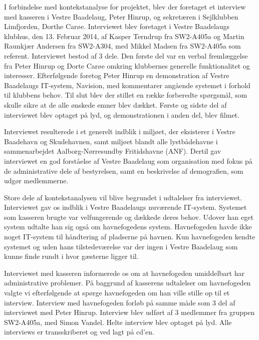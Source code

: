 
I forbindelse med kontekstanalyse for projektet, blev der foretaget et interview med kasseren i Vestre Baadelaug, Peter Hinrup, og sekretæren i Sejlklubben Limfjorden, Dorthe Carøe. Interviewet blev foretaget i Vestre Baadelaugs klubhus, den 13. Februar 2014, af Kasper Terndrup fra SW2-A405a og Martin Raunkjær Andersen fra SW2-A304, med Mikkel Madsen fra SW2-A405a som referent. Interviewet bestod af 3 dele. Den første del var en verbal fremlæggelse fra Peter Hinrup og Dorte Carøe omkring klubbernes generelle funktionalitet og interesser. Efterfølgende foretog Peter Hinrup en demonstration af Vestre Baadelaugs IT-system, Navision, med kommentarer angående systemet i forhold til klubbens behov. Til slut blev der stillet en række forberedte spørgsmål, som skulle sikre at de alle ønskede emner blev dækket. Første og sidste del af interviewet blev optaget på lyd, og demonstrationen i anden del, blev filmet.

Interviewet resulterede i et generelt indblik i miljøet, der eksisterer i Vestre Baadehavn og Skudehavnen, samt miljøet blandt alle lystbådehavne i sammenarbejdet Aalborg-Nørresundby Fritidshavne (ANF). Dertil gav interviewet en god forståelse af Vestre Baadelaug som organisation med fokus på de administrative dele af bestyrelsen, samt en beskrivelse af demografien, som udgør medlemmerne.

Store dele af kontekstanalysen vil blive begrundet i udtalelser fra interviewet. Interviewet gav os indblik i Vestre Baadelaugs nuværende IT-system. Systemet som kasseren brugte var velfungerende og dækkede deres behov. Udover han eget system udtalte han sig også om havnefogedens system. Havnefogeden havde ikke noget IT-system til håndtering af pladserne på havnen. Kun havnefogeden kendte systemet og uden hans tilstedeværelse var der ingen i Vestre Baadelaug som kunne finde rundt i hvor gæsterne ligger til. 

Interviewet med kasseren informerede os om at havnefogeden umiddelbart har administrative problemer. På baggrund af kasserens udtalelser om havnefogeden valgte vi efterfølgende at spørge havnefogeden om han ville stille op til et interview.
Interview med havnefogeden forløb på samme måde som 3 del af interviewet med Peter Hinrup. Interview blev udført af 3 medlemmer fra gruppen SW2-A405a, med Simon Vandel. Helte interview blev optaget på lyd. Alle interviews er transskriberet og ved lagt på cd'en. 

